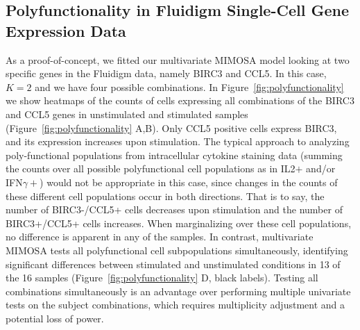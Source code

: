 \documentclass[useAMS,referee,usenatbib]{biom}
\begin{document}
\subsection{Polyfunctionality in Fluidigm Single-Cell Gene Expression Data}
As a proof-of-concept, we fitted our multivariate MIMOSA model looking at two specific genes in the Fluidigm data, namely BIRC3 and CCL5. In this case, $K=2$ and we have four possible combinations. 
In Figure~\ref{fig:polyfunctionality} we show heatmaps of the counts of cells expressing all combinations of the BIRC3 and CCL5 genes in unstimulated and stimulated samples (Figure~\ref{fig:polyfunctionality} A,B). Only CCL5 positive cells express BIRC3, and its expression increases upon stimulation. The typical approach to analyzing poly-functional populations from intracellular cytokine staining data (summing the counts over all possible polyfunctional cell populations  as in IL2$+$ and/or IFN$\gamma+$) would not be appropriate in this case, since changes in the counts of these different cell populations occur in both directions. That is to say, the number of BIRC3-/CCL5+ cells decreases upon stimulation and the number of BIRC3+/CCL5+ cells increases. When marginalizing over these cell populations, no difference is apparent in any of the samples. In contrast, multivariate MIMOSA tests all polyfunctional cell subpopulations simultaneously, identifying significant differences between stimulated and unstimulated conditions in 13 of the 16 samples (Figure~\ref{fig:polyfunctionality} D, black labels). Testing all combinations simultaneously is an advantage over performing multiple univariate tests on the subject combinations, which requires multiplicity adjustment and a potential loss of power. 
\end{document}
